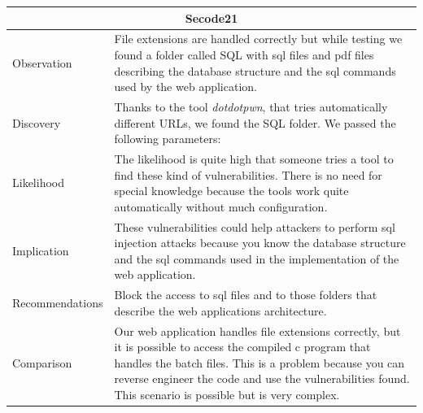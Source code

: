 \documentclass[headsepline,footsepline,footinclude=false,oneside,fontsize=11pt,paper=a4,listof=totoc,bibliography=totoc]{scrbook} %
\begin{document}
\begin{tabular}{ l|p{11cm}  }
	\hline
	\multicolumn{2}{c}{\textbf{Secode21}} \\
	\hline
	Observation   & File extensions are handled correctly but while testing we found a folder called SQL with sql files and pdf files describing the database structure and the sql commands used by the web application.    \\
	Discovery  & Thanks to the tool \textit{dotdotpwn}, that tries automatically different URLs, we found the SQL folder. We passed the following parameters: \\
	Likelihood & The likelihood is quite high that someone tries a tool to find these kind of vulnerabilities. There is no need for special knowledge because the tools work quite automatically without much configuration. \\
	Implication    & These vulnerabilities could help attackers to perform sql injection attacks because you know the database structure and the sql commands used in the implementation of the web application. \\
	Recommendations& Block the access to sql files and to those folders that describe the web applications architecture. \\
	Comparison& Our web application handles file extensions correctly, but it is possible to access the compiled c program that handles the batch files. This is a problem because you can reverse engineer the code and use the vulnerabilities found. This scenario is possible but is very complex. \\
	\hline
\end{tabular}
\\
\vspace{0.5cm}
\\
\end{document}
